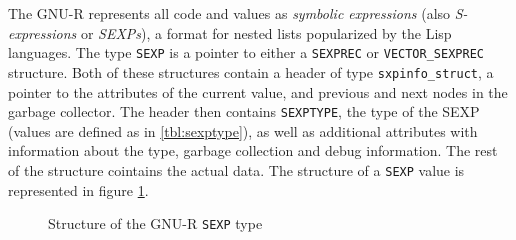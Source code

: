 The GNU-R represents all code and values as \textit{symbolic expressions} (also \textit{S-expressions} or \textit{SEXPs}), a format for nested lists popularized by the Lisp languages. The type \texttt{SEXP} is a pointer to either a \texttt{SEXPREC} or \texttt{VECTOR\_SEXPREC} structure. Both of these structures contain a header of type \texttt{sxpinfo\_struct}, a pointer to the attributes of the current value, and previous and next nodes in the garbage collector. The header then contains \texttt{SEXPTYPE}, the type of the SEXP (values are defined as in \ref{tbl:sexptype}), as well as additional attributes with information about the type, garbage collection and debug information. The rest of the structure cointains the actual data. The structure of a \texttt{SEXP} value is represented in figure \ref{fig:sexp-struct}.

\begin{figure}
	\centering
	\begin{adjustbox}{trim=5pt 20pt 0 40pt, clip}
	\end{adjustbox}
	\caption{Structure of the GNU-R \texttt{SEXP} type}\label{fig:sexp-struct}
\end{figure}

